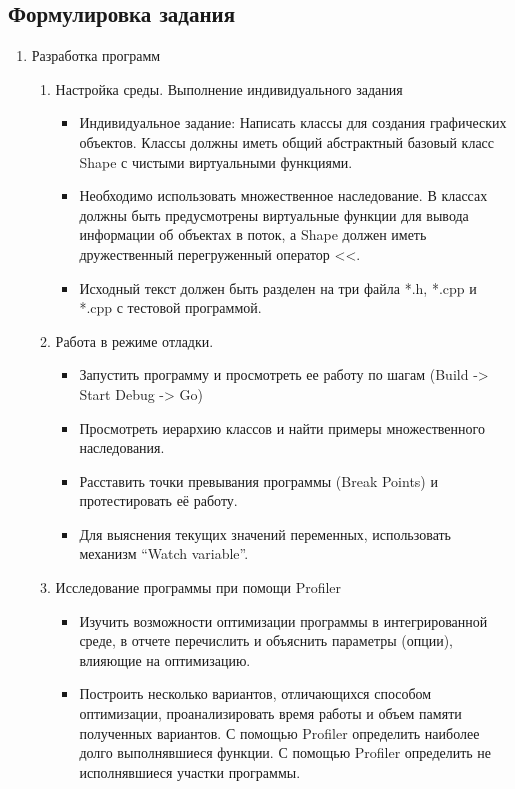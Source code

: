 \documentclass[a4paper, 14pt]{extarticle}
\begin{document}
\subsection{Формулировка задания}
\begin{enumerate}
    \item Разработка программ
    \begin{enumerate}
        \item Настройка среды. Выполнение индивидуального задания
        \begin{itemize}
            \item Индивидуальное задание: Написать классы для создания графических объектов. Классы должны иметь общий абстрактный базовый класс Shape с чистыми виртуальными функциями.
            \item Необходимо использовать множественное наследование. В классах должны быть предусмотрены виртуальные функции для вывода информации об объектах в поток, а Shape должен иметь дружественный перегруженный оператор <<.
            \item Исходный текст должен быть разделен на три файла *.h, *.cpp и *.cpp с тестовой программой.
        \end{itemize}
        \item Работа в режиме отладки.
        \begin{itemize}
            \item Запустить программу и просмотреть ее работу по шагам (Build -> Start Debug -> Go)
            \item Просмотреть иерархию классов и найти примеры множественного наследования.
            \item Расставить точки превывания программы (Break Points) и протестировать её работу.
            \item Для выяснения текущих значений переменных, использовать механизм ``Watch variable''.
        \end{itemize}
        \item Исследование программы при помощи Profiler
        \begin{itemize}
            \item Изучить возможности оптимизации программы в интегрированной среде, в отчете перечислить и объяснить параметры (опции), влияющие на оптимизацию.
            \item Построить несколько вариантов, отличающихся способом оптимизации, проанализировать время работы и объем памяти полученных вариантов. С помощью Profiler определить наиболее долго выполнявшиеся функции. С помощью Profiler определить не исполнявшиеся участки программы.

\end{itemize}
\end{enumerate}
\end{enumerate}
\end{document}
